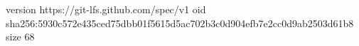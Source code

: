 version https://git-lfs.github.com/spec/v1
oid sha256:5930c572e435ced75dbb01f5615d5ac702b3c0d904efb7e2cc0d9ab2503d61b8
size 68
